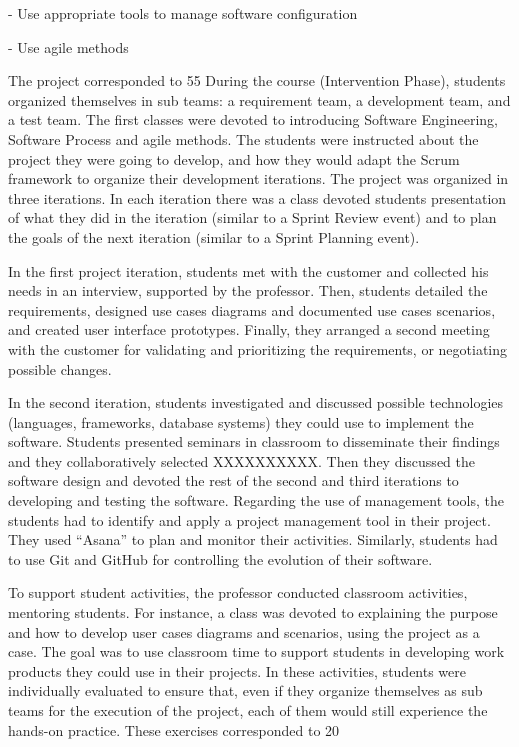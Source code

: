 -	Use appropriate tools to manage software configuration

-	Use agile methods

The project corresponded to 55%
During the course (Intervention Phase), students organized themselves in sub teams: a requirement team, a development team, and a test team. The first classes were devoted to introducing Software Engineering, Software Process and agile methods. The students were instructed about the project they were going to develop, and how they would adapt the Scrum framework to organize their development iterations. The project was organized in three iterations. In each iteration there was a class devoted students presentation of what they did in the iteration (similar to a Sprint Review event) and to plan the goals of the next iteration (similar to a Sprint Planning event).

In the first project iteration, students met with the customer and collected his needs in an interview, supported by the professor. Then, students detailed the requirements, designed use cases diagrams and documented use cases scenarios, and created user interface prototypes. Finally, they arranged a second meeting with the customer for validating and prioritizing the requirements, or negotiating possible changes.

In the second iteration, students investigated and discussed possible technologies (languages, frameworks, database systems) they could use to implement the software. Students presented seminars in classroom to disseminate their findings and they collaboratively selected XXXXXXXXXX. Then they discussed the software design and devoted the rest of the second and third iterations to developing and testing the software.
Regarding the use of management tools, the students had to identify and apply a project management tool in their project. They used “Asana” to plan and monitor their activities. Similarly, students had to use Git and GitHub for controlling the evolution of their software.

To support student activities, the professor conducted classroom activities, mentoring students. For instance, a class was devoted to explaining the purpose and how to develop user cases diagrams and scenarios, using the project as a case. The goal was to use classroom time to support students in developing work products they could use in their projects. In these activities, students were individually evaluated to ensure that, even if they organize themselves as sub teams for the execution of the project, each of them would still experience the hands-on practice. These exercises corresponded to 20%


